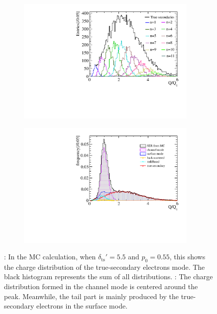 \begin{figure}[!htbp]
	\begin{subfigure}{0.5\linewidth}
		\includegraphics[width=0.95\textwidth]{PMTRelated/GTmodel/true_all.pdf}
		\caption{}
		\label{fig:true_n}
	\end{subfigure}%
	\hfill
	\begin{subfigure}{0.5\linewidth}
		\includegraphics[width=0.95\textwidth]{PMTRelated/GTmodel/allmode.pdf}
		\caption{}
		\label{fig:allmode}
	\end{subfigure}
	\caption{: In the MC calculation, when $\delta_{\mathrm{ts}}' = 5.5$ and $p_0 = 0.55$, this shows the charge distribution of the true-secondary electrons mode. The black histogram represents the sum of all distributions. : The charge distribution formed in the channel mode is centered around the peak. Meanwhile, the tail part is mainly produced by the true-secondary electrons in the surface mode. }
\end{figure}

